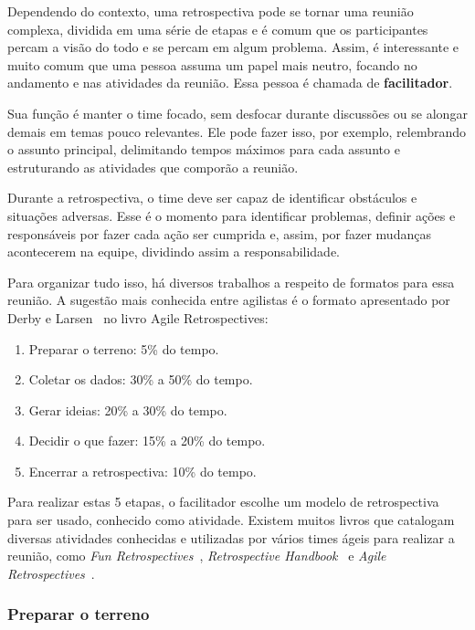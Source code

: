 Dependendo do contexto, uma retrospectiva pode se tornar uma reunião complexa, dividida em uma série de etapas e é comum que os participantes percam a visão do todo e se percam em algum problema. Assim, é interessante e muito comum que uma pessoa assuma um papel mais neutro, focando no andamento e nas atividades da reunião. Essa pessoa é chamada de \textbf{facilitador}.

Sua função é manter o time focado, sem desfocar durante discussões ou se alongar demais em temas pouco relevantes. Ele pode fazer isso, por exemplo, relembrando o assunto principal, delimitando tempos máximos para cada assunto e estruturando as atividades que comporão a reunião.

Durante a retrospectiva, o time deve ser capaz de identificar obstáculos e situações adversas. Esse é o momento para identificar problemas, definir ações e responsáveis por fazer cada ação ser cumprida e, assim, por fazer mudanças acontecerem na equipe, dividindo assim a responsabilidade.

Para organizar tudo isso, há diversos trabalhos a respeito de formatos para essa reunião. A sugestão mais conhecida entre agilistas é o formato apresentado por Derby e Larsen~\cite{retrospectives} no livro Agile Retrospectives: 

\begin{enumerate}
	\item Preparar o terreno: 5\% do tempo.
	\item Coletar os dados: 30\% a 50\% do tempo.
	\item Gerar ideias: 20\% a 30\% do tempo.
	\item Decidir o que fazer: 15\% a 20\% do tempo.
	\item Encerrar a retrospectiva: 10\% do tempo.
\end{enumerate}

Para realizar estas 5 etapas, o facilitador escolhe um modelo de retrospectiva para ser usado, conhecido como atividade. Existem muitos livros que catalogam diversas atividades conhecidas e utilizadas por vários times ágeis para realizar a reunião, como \textit{Fun Retrospectives}~\cite{funRetrospectives}, \textit{Retrospective Handbook}~\cite{handRetrospectives} e \textit{Agile Retrospectives}~\cite{retrospectives}.

\subsubsection*{Preparar o terreno}

